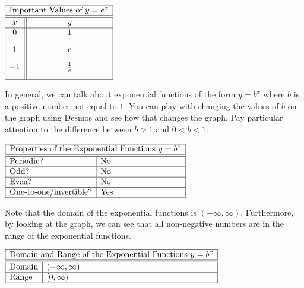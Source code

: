 \documentclass[nooutcomes]{ximera}
\begin{document}
\begin{center}
\(
\begin{array}{ |c || c|  }
 \hline
 \multicolumn{2}{|c|}{\text{\normalfont Important Values of } y=e^x} \\
\hline
 \hline
 x & y\\
 \hline
 0&1\\[2ex]
 1&e\\[2ex]
 -1&\frac{1}{e}\\[2ex]
 \hline
\end{array}
\)
\end{center}

In general, we can talk about exponential functions of the form $y=b^{x}$ where $b$ is a positive number not equal to $1$.  You can play with changing the values of $b$ on the graph using Desmos and see how that changes the graph.  Pay particular attention to the difference between $b>1$ and $0<b<1$.

\begin{center}  
\end{center}

\begin{center}
$
\begin{array}{|l|l|}
 \hline
 \multicolumn{2}{|c|}{\text{\normalfont Properties of the Exponential Functions } y=b^x} \\
\hline
 \hline
\text{Periodic?} & \text{No} \\ \hline
\text{Odd?} & \text{No} \\ \hline
\text{Even?} & \text{No} \\ \hline
\text{One-to-one/invertible?} & \text{Yes} \\ \hline
\end{array}
$
\end{center}

Note that the domain of the exponential functions is $(-\infty, \infty)$. Furthermore, by looking at the graph, we can see that all non-negative numbers are in the range of the exponential functions.


\begin{center}
$
\begin{array}{|l|l|}
 \hline
 \multicolumn{2}{|c|}{\text{\normalfont Domain and Range of the Exponential Functions } y=b^x} \\
\hline
 \hline
\text{Domain} & (-\infty, \infty) \\ \hline
\text{Range} & [0, \infty) \\ \hline
\end{array}
$
\end{center}
\end{document}
